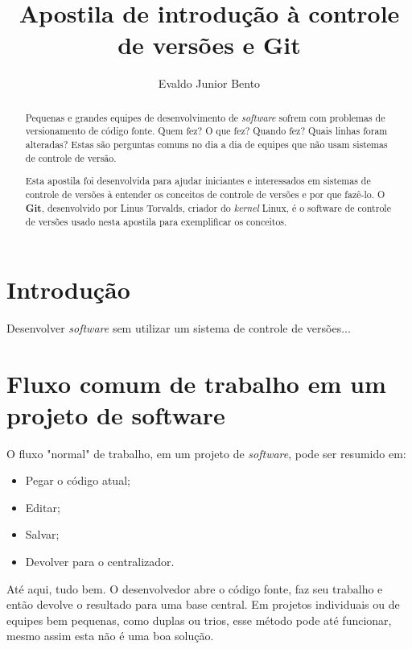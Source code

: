 \documentclass[12pt,a4paper]{report}
\begin{document}
\title{Apostila de introdução à controle de versões e Git}
\author{Evaldo Junior Bento}

\maketitle

\begin{abstract}
Pequenas e grandes equipes de desenvolvimento de \textit{software} sofrem
com problemas de versionamento de código fonte. Quem fez? O que fez? Quando
fez? Quais linhas foram alteradas? Estas são perguntas comuns no dia a dia de
equipes que não usam sistemas de controle de versão.

Esta apostila foi desenvolvida para ajudar iniciantes e interessados em
sistemas de controle de versões à entender os conceitos de controle de versões
e por que fazê-lo. O \textbf{Git}, desenvolvido por Linus Torvalds, criador do
\textit{kernel} Linux, é o software de controle de versões usado nesta
apostila para exemplificar os conceitos.
\end{abstract}

\tableofcontents

\chapter{Introdução}
    Desenvolver \textit{software} sem utilizar um sistema de controle de versões...

\chapter{Fluxo comum de trabalho em um projeto de software}
    O fluxo "normal" de trabalho, em um projeto de \textit{software}, pode ser
    resumido em:
    \begin{itemize}
        \item Pegar o código atual;
        \item Editar;
        \item Salvar;
        \item Devolver para o centralizador.
    \end{itemize}
    Até aqui, tudo bem. O desenvolvedor abre o código fonte, faz seu trabalho e
    então devolve o resultado para uma base central. Em projetos individuais ou
    de equipes bem pequenas, como duplas ou trios, esse método pode até
    funcionar, mesmo assim esta não é uma boa solução.
    
\end{document}

